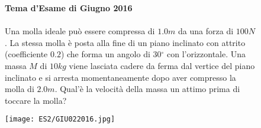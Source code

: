     \begin{figure}[h!]
    \textbf{Tema d'Esame di Giugno 2016}\\ \\
    Una molla ideale può essere compressa di $1.0 m$ da una forza di $100 N$. La stessa molla è posta alla fine di un piano inclinato con attrito (coefficiente $0.2$) che forma un angolo di 30$^{\circ}$ con l'orizzontale. Una massa $M$ di $10 kg$ viene lasciata cadere da ferma dal vertice del piano inclinato e si arresta momentaneamente dopo aver compresso la molla di $2.0 m$. Qual'è la velocità della massa un attimo prima di toccare la molla? 
    \\
        \begin{center}
            \texttt{[image: ES2/GIU022016.jpg]}
        \end{center}


\end{figure}
